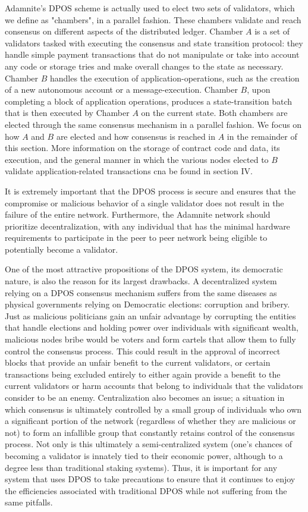 \documentclass[conference]{IEEEtran}
\begin{document}
Adamnite's DPOS scheme is actually used to elect two sets of validators, which we define as "chambers", in a parallel fashion. These chambers validate and reach consensus on different aspects of the distributed ledger. Chamber $A$ is a set of validators tasked with executing the consensus and state transition protocol: they handle simple payment transactions that do not manipulate or take into account any code or storage tries and make overall changes to the state as necessary. Chamber $B$ handles the execution of application-operations, such as the creation of a new autonomous account or a message-execution. Chamber $B$, upon completing a block of application operations, produces a state-transition batch that is then executed by Chamber $A$ on the current state.  Both chambers are elected through the same consensus mechanism in a parallel fashion. We focus on how $A$ and $B$ are elected and how consensus is reached in $A$ in the remainder of this section. More information on the storage of contract code and data, its execution, and the general manner in which the various nodes elected to $B$ validate application-related transactions cna be found in section IV.

It is extremely important that the DPOS process is secure and ensures that the compromise or malicious behavior of a single validator does not result in the failure of the entire network. Furthermore, the Adamnite network should prioritize decentralization, with any individual that has the minimal hardware requirements to participate in the peer to peer network being eligible to potentially become a validator.

One of the most attractive propositions of the DPOS system, its democratic nature, is also the reason for its largest drawbacks. A decentralized system relying on a DPOS consensus mechanism suffers from the same diseases as physical governments relying on Democratic elections: corruption and bribery. Just as malicious politicians gain an unfair advantage by corrupting the entities that handle elections and holding power over individuals with significant wealth, malicious nodes bribe would be voters and form cartels that allow them to fully control the consensus process. This could result in the approval of incorrect blocks that provide an unfair benefit to the current validators, or certain transactions being excluded entirely to either again provide a benefit to the current validators or harm accounts that belong to individuals that the validators consider to be an enemy. Centralization also becomes an issue; a situation in which consensus is ultimately controlled by a small group of individuals who own a significant portion of the network (regardless of whether they are malicious or not) to form an infallible group that constantly retains control of the consensus process. Not only is this ultimately a semi-centralized system (one's chances of becoming a validator is innately tied to their economic power, although to a degree less than traditional staking systems). Thus, it is important for any system that uses DPOS to take precautions to ensure that it continues to enjoy the efficiencies associated with traditional DPOS while not suffering from the same pitfalls.
\end{document}
